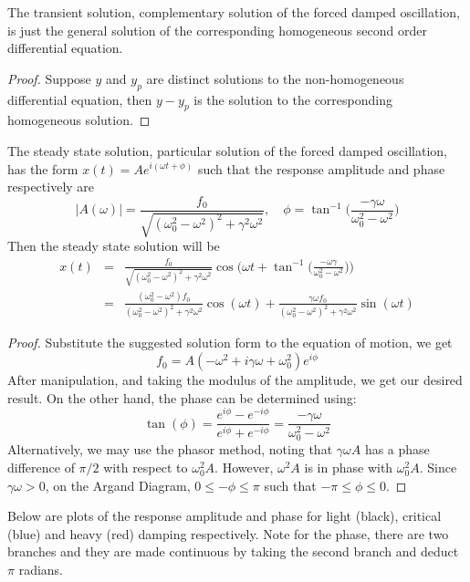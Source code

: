 \documentclass[a4paper]{article}
\begin{document}
\begin{thm}
The transient solution, complementary solution of the forced damped oscillation, is just the general solution of the corresponding homogeneous second order differential equation.
\end{thm}
\begin{proof}
Suppose $y$ and $y_p$ are distinct solutions to the non-homogeneous differential equation, then $y-y_p$ is the solution to the corresponding homogeneous solution.
\end{proof}
\begin{thm}
The steady state solution, particular solution of the forced damped oscillation, has the form $x(t)=Ae^{i(\omega t+\phi)}$ such that the response amplitude and phase respectively are
$$|A(\omega)|=\frac{f_0}{\sqrt{(\omega_0^2-\omega^2)^2+\gamma^2\omega^2}},\quad\phi=\tan^{-1}\bigg(\frac{-\gamma\omega}{\omega_0^2-\omega^2}\bigg)$$
Then the steady state solution will be
\begin{eqnarray}
x(t)&=&\frac{f_0}{\sqrt{(\omega_0^2-\omega^2)^2+\gamma^2\omega^2}}\cos\bigg(\omega t+\tan^{-1}\bigg(\frac{-\omega\gamma}{\omega_0^2-\omega^2}\bigg)\bigg)\nonumber\\&=&\frac{(\omega_0^2-\omega^2)f_0}{(\omega_0^2-\omega^2)^2+\gamma^2\omega^2}\cos(\omega t)+\frac{\gamma\omega f_0}{(\omega_0^2-\omega^2)^2+\gamma^2\omega^2}\sin(\omega t)\nonumber
\end{eqnarray}
\end{thm}
\begin{proof}
Substitute the suggested solution form to the equation of motion, we get
$$f_0=A(-\omega^2+i\gamma\omega+\omega_0^2)e^{i\phi}$$
After manipulation, and taking the modulus of the amplitude, we get our desired result. On the other hand, the phase can be determined using:
$$\tan(\phi)=\frac{e^{i\phi}-e^{-i\phi}}{e^{i\phi}+e^{-i\phi}}=\frac{-\gamma\omega}{\omega_0^2-\omega^2}$$
Alternatively, we may use the phasor method, noting that $\gamma\omega A$ has a phase difference of $\pi/2$ with respect to $\omega_0^2A$. However, $\omega^2A$ is in phase with $\omega_0^2A$. Since $\gamma\omega>0$, on the Argand Diagram, $0\leq-\phi\leq\pi$ such that $-\pi\leq\phi\leq 0$.
\end{proof}
Below are plots of the response amplitude and phase for light (black), critical (blue) and heavy (red) damping respectively. Note for the phase, there are two branches and they are made continuous by taking the second branch and deduct $\pi$ radians.
\end{document}
